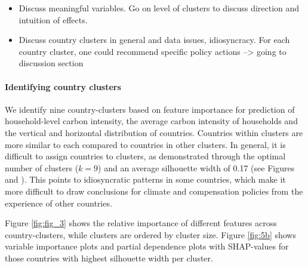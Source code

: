 \documentclass[12pt, a4paper]{article}
\begin{document}

\begin{itemize}
    \item Discuss meaningful variables. Go on level of clusters to discuss direction and intuition of effects.
    \item Discuss country clusters in general and data issues, idiosyncracy. For each country cluster, one could recommend specific policy actions --> going to discussion section
\end{itemize}

\paragraph{Identifying country clusters}

We identify nine country-clusters based on feature importance for prediction of household-level carbon intensity, the average carbon intensity of households and the vertical and horizontal distribution of countries. Countries within clusters are more similar to each compared to countries in other clusters. In general, it is difficult to assign countries to clusters, as demonstrated through the optimal number of clusters ($k=9$) and an average silhouette width of 0.17 (see Figures  and ). This points to idiosyncratic patterns in some countries, which make it more difficult to draw conclusions for climate and compensation policies from the experience of other countries. 

Figure \ref{fig:fig_3} shows the relative importance of different features across country-clusters, while clusters are ordered by cluster size. Figure \ref{fig:5b} shows variable importance plots and partial dependence plots with SHAP-values for those countries with highest silhouette width per cluster.
\end{document}
